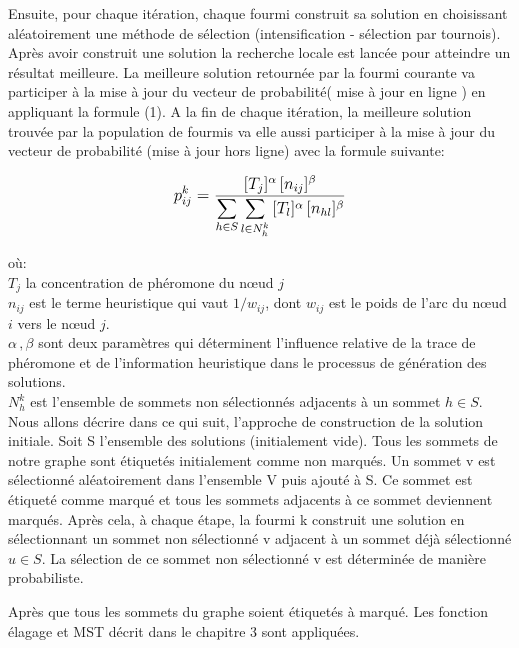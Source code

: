 Ensuite, pour chaque itération, chaque fourmi construit sa solution en choisissant aléatoirement une méthode de sélection (intensification - sélection par tournois). Après avoir construit une solution la recherche locale est lancée pour atteindre un résultat meilleure. La meilleure solution retournée par la fourmi courante va participer à la mise à jour du vecteur de probabilité( mise à jour en ligne ) en appliquant la formule (1). A la fin de chaque itération, la meilleure solution trouvée par la population de fourmis va elle aussi participer à la mise à jour du vecteur de probabilité  (mise à jour hors ligne) avec la formule suivante:

\begin{equation}
	\mathlarger{
		p_{ij}^k = \frac{
				[T_j]^\alpha \, [n_{ij}]^\beta
			}{
				\mathlarger{\sum}_{h \in S} \, \mathlarger{\sum}_{l \in N_h^k} \, [T_l]^\alpha \, [n_{hl}]^\beta
			}
	}
\end{equation}


où:\\
$T_j$ la concentration de phéromone du nœud $j$ \\
$n_{ij}$ est le terme heuristique qui vaut $1 / w_{ij}$, dont $w_{ij}$ est le poids de l’arc du nœud $i$ vers le nœud $j$.\\
$\alpha \, , \beta$ sont deux paramètres qui déterminent l'influence relative de la trace de phéromone et de l'information heuristique dans le processus de génération des solutions. \\
$N_h^k$ est l'ensemble de sommets non sélectionnés adjacents à un sommet $h \in S$. \\

Nous allons décrire dans ce qui suit, l'approche de construction de la solution initiale. Soit S l'ensemble des solutions (initialement vide). Tous les sommets de notre graphe sont étiquetés initialement comme non marqués. Un sommet v est sélectionné aléatoirement dans l'ensemble V puis  ajouté à S. Ce sommet est étiqueté comme marqué et tous les sommets adjacents à ce sommet deviennent marqués. Après cela, à chaque étape, la fourmi k construit une solution en sélectionnant un sommet non sélectionné v adjacent à un sommet déjà sélectionné $u \in S$. La sélection de ce sommet non sélectionné v est déterminée de manière probabiliste.


Après que tous les sommets du graphe soient étiquetés à marqué. Les fonction élagage et MST décrit dans le chapitre 3 sont appliquées.\\

